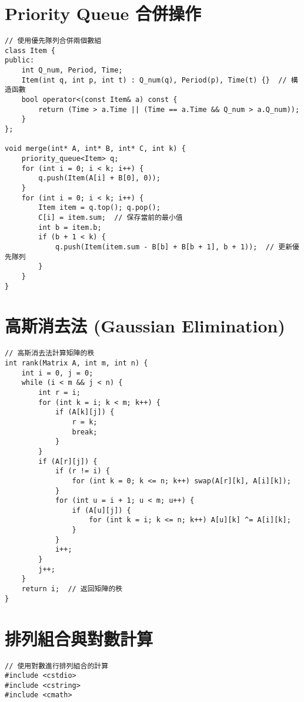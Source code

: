 \documentclass{article}
\begin{document}
\begin{multicols}{2}
\section{Priority Queue 合併操作}

\begin{lstlisting}
// 使用優先隊列合併兩個數組
class Item {
public:
    int Q_num, Period, Time;
    Item(int q, int p, int t) : Q_num(q), Period(p), Time(t) {}  // 構造函數
    bool operator<(const Item& a) const {
        return (Time > a.Time || (Time == a.Time && Q_num > a.Q_num));
    }
};

void merge(int* A, int* B, int* C, int k) {
    priority_queue<Item> q;
    for (int i = 0; i < k; i++) {
        q.push(Item(A[i] + B[0], 0));
    }
    for (int i = 0; i < k; i++) {
        Item item = q.top(); q.pop();
        C[i] = item.sum;  // 保存當前的最小值
        int b = item.b;
        if (b + 1 < k) {
            q.push(Item(item.sum - B[b] + B[b + 1], b + 1));  // 更新優先隊列
        }
    }
}
\end{lstlisting}

\section{高斯消去法 (Gaussian Elimination)}

\begin{lstlisting}
// 高斯消去法計算矩陣的秩
int rank(Matrix A, int m, int n) {
    int i = 0, j = 0;
    while (i < m && j < n) {
        int r = i;
        for (int k = i; k < m; k++) {
            if (A[k][j]) {
                r = k;
                break;
            }
        }
        if (A[r][j]) {
            if (r != i) {
                for (int k = 0; k <= n; k++) swap(A[r][k], A[i][k]);
            }
            for (int u = i + 1; u < m; u++) {
                if (A[u][j]) {
                    for (int k = i; k <= n; k++) A[u][k] ^= A[i][k];
                }
            }
            i++;
        }
        j++;
    }
    return i;  // 返回矩陣的秩
}
\end{lstlisting}

\section{排列組合與對數計算}

\begin{lstlisting}
// 使用對數進行排列組合的計算
#include <cstdio>
#include <cstring>
#include <cmath>


\end{lstlisting}
\end{multicols}
\end{document}
